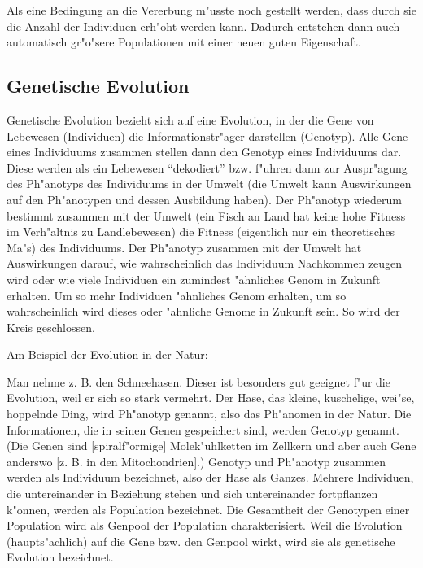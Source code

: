 Als eine Bedingung an die Vererbung m"usste noch gestellt werden, dass durch sie die Anzahl der Individuen erh"oht werden kann. Dadurch entstehen dann auch automatisch gr"o"sere Populationen mit einer neuen guten Eigenschaft.


\subsection{Genetische Evolution}

\bigskip\noindent
{}Genetische Evolution bezieht sich auf eine Evolution, in der die Gene von Lebewesen (Individuen) die Informationstr"ager darstellen (Genotyp). Alle Gene eines Individuums zusammen stellen dann den Genotyp eines Individuums dar. Diese werden als ein Lebewesen ``dekodiert'' bzw. f"uhren dann zur Auspr"agung des Ph"anotyps des Individuums in der Umwelt (die Umwelt kann Auswirkungen auf den Ph"anotypen und dessen Ausbildung haben). Der Ph"anotyp wiederum bestimmt zusammen mit der Umwelt (ein Fisch an Land hat keine hohe Fitness im Verh"altnis zu Landlebewesen) die Fitness (eigentlich nur ein theoretisches Ma"s) des Individuums. Der Ph"anotyp zusammen mit der Umwelt hat Auswirkungen darauf, wie wahrscheinlich das Individuum Nachkommen zeugen wird oder wie viele Individuen ein zumindest "ahnliches Genom in Zukunft erhalten. Um so mehr Individuen "ahnliches Genom erhalten, um so wahrscheinlich wird dieses oder "ahnliche Genome in Zukunft sein.
So wird der Kreis geschlossen.

\bigskip\noindent
Am Beispiel der Evolution in der Natur:

Man nehme z. B. den Schneehasen. Dieser ist besonders gut geeignet f"ur die Evolution, weil er sich so stark vermehrt. Der Hase, das kleine, kuschelige, wei"se, hoppelnde Ding, wird Ph"anotyp genannt, also das Ph"anomen in der Natur. Die Informationen, die in seinen Genen gespeichert sind, werden Genotyp genannt. (Die Genen sind [spiralf"ormige] Molek"uhlketten im Zellkern und aber auch Gene anderswo [z. B. in den Mitochondrien].)
Genotyp und Ph"anotyp zusammen werden als Individuum bezeichnet, also der Hase als Ganzes. Mehrere Individuen, die untereinander in Beziehung stehen und sich untereinander fortpflanzen k"onnen, werden als Population bezeichnet. Die Gesamtheit der Genotypen einer Population wird als Genpool der Population charakterisiert. Weil die Evolution (haupts"achlich) auf die Gene bzw. den Genpool wirkt, wird sie als genetische Evolution bezeichnet.

